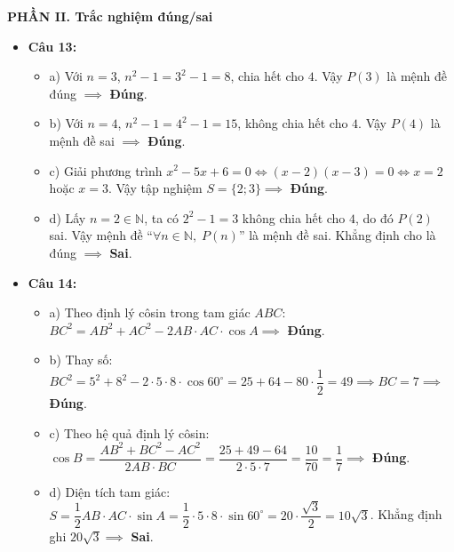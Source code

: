 \documentclass[12pt,a4paper]{article}
\begin{document}
\vspace{0.15cm}
\textbf{PHẦN II. Trắc nghiệm đúng/sai}
\begin{itemize}[leftmargin=0.6cm, itemsep=1.5pt, topsep=1pt]
    \item \textbf{Câu 13:}
    \begin{itemize}[itemsep=1pt]
        \item a) Với $n = 3$, $n^2 - 1 = 3^2 - 1 = 8$, chia hết cho $4$. Vậy $P(3)$ là mệnh đề đúng $\implies$ \textbf{Đúng}.
        \item b) Với $n = 4$, $n^2 - 1 = 4^2 - 1 = 15$, không chia hết cho $4$. Vậy $P(4)$ là mệnh đề sai $\implies$ \textbf{Đúng}.
        \item c) Giải phương trình $x^2 - 5x + 6 = 0 \iff (x - 2)(x - 3) = 0 \iff x = 2$ hoặc $x = 3$. Vậy tập nghiệm $S = \{2; 3\} \implies$ \textbf{Đúng}.
        \item d) Lấy $n = 2 \in \mathbb{N}$, ta có $2^2 - 1 = 3$ không chia hết cho $4$, do đó $P(2)$ sai. Vậy mệnh đề ``$\forall n \in \mathbb{N},\; P(n)$'' là mệnh đề sai. Khẳng định cho là đúng $\implies$ \textbf{Sai}.
    \end{itemize}

    \item \textbf{Câu 14:}
    \begin{itemize}[itemsep=1pt]
        \item a) Theo định lý côsin trong tam giác $ABC$: $BC^2 = AB^2 + AC^2 - 2AB \cdot AC \cdot \cos A \implies$ \textbf{Đúng}.
        \item b) Thay số: $BC^2 = 5^2 + 8^2 - 2 \cdot 5 \cdot 8 \cdot \cos 60^\circ = 25 + 64 - 80 \cdot \dfrac{1}{2} = 49 \implies BC = 7 \implies$ \textbf{Đúng}.
        \item c) Theo hệ quả định lý côsin: $\cos B = \dfrac{AB^2 + BC^2 - AC^2}{2AB \cdot BC} = \dfrac{25 + 49 - 64}{2 \cdot 5 \cdot 7} = \dfrac{10}{70} = \dfrac{1}{7} \implies$ \textbf{Đúng}.
        \item d) Diện tích tam giác: $S = \dfrac{1}{2}AB \cdot AC \cdot \sin A = \dfrac{1}{2} \cdot 5 \cdot 8 \cdot \sin 60^\circ = 20 \cdot \dfrac{\sqrt{3}}{2} = 10\sqrt{3}$. Khẳng định ghi $20\sqrt{3} \implies$ \textbf{Sai}.
    \end{itemize}
\end{itemize}
\end{document}
